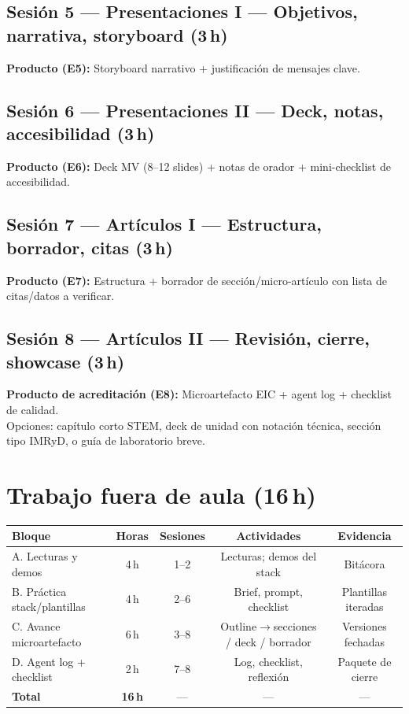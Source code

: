 \subsection{Sesión 5 --- Presentaciones I --- Objetivos, narrativa, storyboard (3\,h)}
\textbf{Producto (E5):} Storyboard narrativo + justificación de mensajes clave.

\subsection{Sesión 6 --- Presentaciones II --- Deck, notas, accesibilidad (3\,h)}
\textbf{Producto (E6):} Deck MV (8--12 slides) + notas de orador + mini-checklist de accesibilidad.

\subsection{Sesión 7 --- Artículos I --- Estructura, borrador, citas (3\,h)}
\textbf{Producto (E7):} Estructura + borrador de sección/micro-artículo con lista de citas/datos a verificar.

\subsection{Sesión 8 --- Artículos II --- Revisión, cierre, showcase (3\,h)}
\textbf{Producto de acreditación (E8):} Microartefacto EIC + agent log + checklist de calidad.\\
Opciones: capítulo corto STEM, deck de unidad con notación técnica, sección tipo IMRyD, o guía de laboratorio breve.

\section{Trabajo fuera de aula (16\,h)}

\begin{tabularx}{\textwidth}{@{}Xcccc@{}}
\toprule
Bloque & Horas & Sesiones & Actividades & Evidencia \\
\midrule
A. Lecturas y demos & 4\,h & 1--2 & Lecturas; demos del stack & Bitácora \\
B. Práctica stack/plantillas & 4\,h & 2--6 & Brief, prompt, checklist & Plantillas iteradas \\
C. Avance microartefacto & 6\,h & 3--8 & Outline$\rightarrow$secciones / deck / borrador & Versiones fechadas \\
D. Agent log + checklist & 2\,h & 7--8 & Log, checklist, reflexión & Paquete de cierre \\
\textbf{Total} & \textbf{16\,h} & --- & --- & --- \\
\bottomrule
\end{tabularx}

